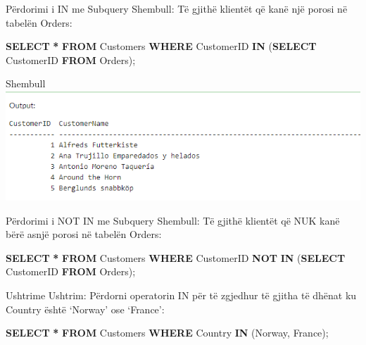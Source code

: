 \documentclass[
  ignorenonframetext,
]{beamer}
\newenvironment{Shaded}{\begin{snugshade}}{\end{snugshade}}
\newcommand{\KeywordTok}[1]{\textcolor[rgb]{0.13,0.29,0.53}{\textbf{#1}}}
\newcommand{\NormalTok}[1]{#1}
\newcommand{\OperatorTok}[1]{\textcolor[rgb]{0.81,0.36,0.00}{\textbf{#1}}}
\newcommand{\StringTok}[1]{\textcolor[rgb]{0.31,0.60,0.02}{#1}}
\begin{document}
\begin{frame}[fragile]{Përdorimi i IN me Subquery}
\label{puxebrdorimi-i-in-me-subquery}
Shembull: Të gjithë klientët që kanë një porosi në tabelën Orders:

\begin{Shaded}
\begin{Highlighting}[]
\KeywordTok{SELECT} \OperatorTok{*}
\KeywordTok{FROM}\NormalTok{ Customers}
\KeywordTok{WHERE}\NormalTok{ CustomerID }\KeywordTok{IN}\NormalTok{ (}\KeywordTok{SELECT}\NormalTok{ CustomerID }\KeywordTok{FROM}\NormalTok{ Orders);}
\end{Highlighting}
\end{Shaded}
\end{frame}

\begin{frame}{Shembull}
\label{shembull-22}
\includegraphics{./Figs/query77.png}
\end{frame}

\begin{frame}[fragile]{Përdorimi i NOT IN me Subquery}
\label{puxebrdorimi-i-not-in-me-subquery}
Shembull: Të gjithë klientët që NUK kanë bërë asnjë porosi në tabelën
Orders:

\begin{Shaded}
\begin{Highlighting}[]
\KeywordTok{SELECT} \OperatorTok{*}
\KeywordTok{FROM}\NormalTok{ Customers}
\KeywordTok{WHERE}\NormalTok{ CustomerID }\KeywordTok{NOT} \KeywordTok{IN}\NormalTok{ (}\KeywordTok{SELECT}\NormalTok{ CustomerID }\KeywordTok{FROM}\NormalTok{ Orders);}
\end{Highlighting}
\end{Shaded}
\end{frame}

\begin{frame}[fragile]{Ushtrime}
\label{ushtrime}
Ushtrim: Përdorni operatorin IN për të zgjedhur të gjitha të dhënat ku
Country është `Norway' ose `France':

\begin{Shaded}
\begin{Highlighting}[]
\KeywordTok{SELECT} \OperatorTok{*}
\KeywordTok{FROM}\NormalTok{ Customers}
\KeywordTok{WHERE}\NormalTok{ Country }\KeywordTok{IN}\NormalTok{ (}\StringTok{\textquotesingle{}Norway\textquotesingle{}}\NormalTok{, }\StringTok{\textquotesingle{}France\textquotesingle{}}\NormalTok{);}
\end{Highlighting}
\end{Shaded}
\end{frame}
\end{document}
